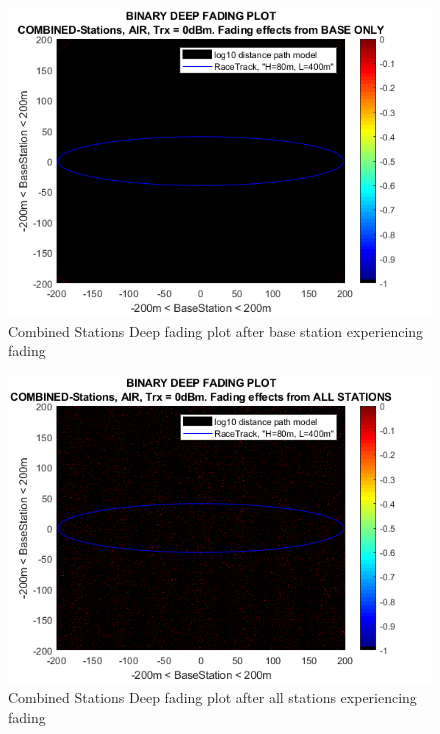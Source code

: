 \begin{figure}[H]
	\centering
	\includegraphics[width=\linewidth]{theory/fading/fig/binaryDeepFading_combinedStations_baseOnly.png}
	\caption{Combined Stations Deep fading plot after base station experiencing fading}
	\label{fig:binaryDeepFading_combinedStations_baseOnly}
\end{figure}

\begin{figure}[H]
	\centering
	\includegraphics[width=\linewidth]{theory/fading/fig/binaryDeepFading_combinedStations_allStations.png}
	\caption{Combined Stations Deep fading plot after all stations experiencing fading}
	\label{fig:binaryDeepFading_combinedStations_allStations}
\end{figure}

